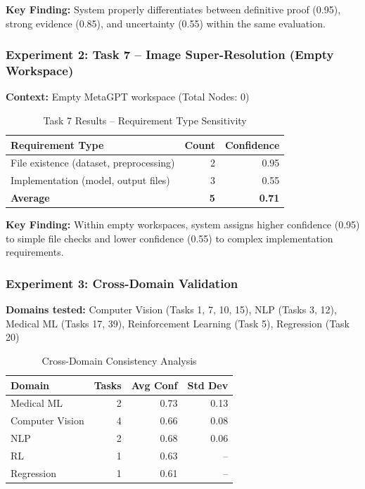\documentclass[11pt,a4paper]{article}
\begin{document}
\textbf{Key Finding:} System properly differentiates between definitive proof (0.95), strong evidence (0.85), and uncertainty (0.55) within the same evaluation.

\subsubsection{Experiment 2: Task 7 -- Image Super-Resolution (Empty Workspace)}

\textbf{Context:} Empty MetaGPT workspace (Total Nodes: 0)

\begin{table}[H]
\centering
\caption{Task 7 Results -- Requirement Type Sensitivity}
\begin{tabular}{lrr}
\toprule
\textbf{Requirement Type} & \textbf{Count} & \textbf{Confidence} \\
\midrule
File existence (dataset, preprocessing) & 2 & 0.95 \\
Implementation (model, output files) & 3 & 0.55 \\
\midrule
\textbf{Average} & \textbf{5} & \textbf{0.71} \\
\bottomrule
\end{tabular}
\label{tab:task7-results}
\end{table}

\textbf{Key Finding:} Within empty workspaces, system assigns higher confidence (0.95) to simple file checks and lower confidence (0.55) to complex implementation requirements.

\subsubsection{Experiment 3: Cross-Domain Validation}

\textbf{Domains tested:} Computer Vision (Tasks 1, 7, 10, 15), NLP (Tasks 3, 12), Medical ML (Tasks 17, 39), Reinforcement Learning (Task 5), Regression (Task 20)

\begin{table}[H]
\centering
\caption{Cross-Domain Consistency Analysis}
\begin{tabular}{lrrr}
\toprule
\textbf{Domain} & \textbf{Tasks} & \textbf{Avg Conf} & \textbf{Std Dev} \\
\midrule
Medical ML & 2 & 0.73 & 0.13 \\
Computer Vision & 4 & 0.66 & 0.08 \\
NLP & 2 & 0.68 & 0.06 \\
RL & 1 & 0.63 & -- \\
Regression & 1 & 0.61 & -- \\
\bottomrule
\end{tabular}
\label{tab:cross-domain}
\end{table}
\end{document}
